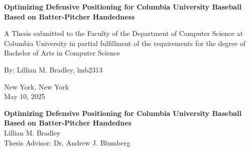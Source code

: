 \documentclass{article}
\begin{document}
\begin{titlepage}
    \centering
    {\LARGE \textbf{Optimizing Defensive Positioning for Columbia University Baseball Based on Batter-Pitcher Handedness}} \\[1.5cm] 
    
    \vspace{5cm}
    
    {\large A Thesis submitted to the Faculty of the Department of Computer Science at Columbia University in partial fulfillment of the requirements for the degree of Bachelor of Arts in Computer Science} \\[2cm]

    \vspace{5cm} 
    
    {\large By: Lillian M. Bradley, lmb2313} \\[0.5cm]
    
    
    \vfill 

    {\large New York, New York} \\[0.5cm]
    {\large May 10, 2025}
\end{titlepage}


\begin{center}
    {\textbf{Optimizing Defensive Positioning for Columbia University Baseball Based on Batter-Pitcher Handednes}} \\[1cm]
    {Lillian M. Bradley} \\[0.5cm]
    {Thesis Advisor: Dr. Andrew J. Blumberg} \\[2cm]
\end{center}
\begin{abstract} 
Defensive positioning is a crucial aspect of baseball, influencing the probability of converting balls in play into outs. While traditional positioning strategies rely on player intuition and experience, data-driven approaches can optimize defensive alignment based on batter-pitcher match-ups. This project aims to develop a predictive model to optimize defensive positioning for Columbia University Baseball, leveraging TrackMan data and advanced machine learning techniques. TrackMan data from the 2022-2024 seasons was used to train an XGBoost model, predicting the optimal defensive positions for each player based on batter-pitcher handedness. Key features included batter and pitcher handedness, player position (X, Z coordinates), and infield shifting. The model achieved an accuracy of $75.50\%$, accurately predicting the optimal defensive positioning for each player. Significant positional shifts were observed for players based on batter-pitcher match-ups, especially for middle infielders. The optimized defensive positioning model provides actionable insights for Columbia Baseball and can be adapted for other NCAA teams, enabling them to adjust fielding positions based on real-time batter-pitcher match-ups. Future work could include incorporating additional features, such as weather data, hit location data, and player-specific attributes, to further improve the model's accuracy.
\end{abstract}
\end{document}
